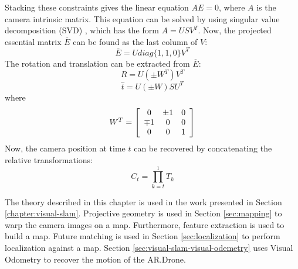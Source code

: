 Stacking these constraints gives the linear equation $A E = 0$, where $A$ is the camera intrinsic matrix.
This equation can be solved by using singular value decomposition (SVD) \cite{klema1980singular}, which has the form $A = USV^T$.
Now, the projected essential matrix $\overline{E}$ can be found as the last column of $V$:
\begin{equation}
\overline{E} = U diag\{1, 1, 0\} V^T
\end{equation}
The rotation and translation can be extracted from $\overline{E}$:
\begin{equation}
R = U (\pm W^T) V^T
\end{equation}
\begin{equation}
\hat{t} = U (\pm W) S U^T
\end{equation}
where
\begin{equation}
W^T =
\left[ \begin{array}{c c c}
0 & \pm 1 & 0 \\
\mp 1 & 0 & 0 \\
0 & 0 & 1
\end{array} \right]
\end{equation}
Now, the camera position at time $t$ can be recovered by concatenating the relative transformations:
\begin{equation}
C_t = \prod_{k=t}^1T_{k}
\end{equation}

The theory described in this chapter is used in the work presented in Section \ref{chapter:visual-slam}.
Projective geometry is used in Section \ref{sec:mapping} to warp the camera images on a map.
Furthermore, feature extraction is used to build a map.
Future matching is used in Section \ref{sec:localization} to perform localization against a map.
Section \ref{sec:visual-slam-visual-odemetry} uses Visual Odometry to recover the motion of the AR.Drone.
